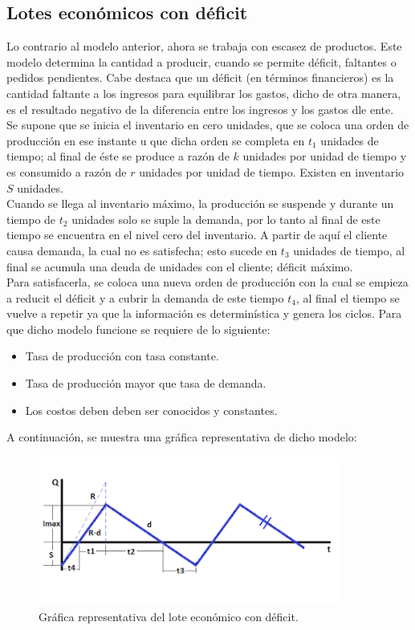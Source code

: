 \documentclass[letterpaper, 12pt]{article}
\begin{document}
    \subsection{Lotes económicos con déficit}
    \justify
    Lo contrario al modelo anterior, ahora se trabaja con escasez de productos. Este modelo determina la cantidad a producir, cuando se permite déficit, faltantes o pedidos pendientes. Cabe destaca que un déficit (en términos financieros)
    es la cantidad faltante a los ingresos para equilibrar los gastos, dicho de otra manera, es el resultado negativo de la diferencia entre los ingresos y los gastos dle ente.
    \\\newline 
    Se supone que se inicia el inventario en cero unidades, que se coloca una orden de producción en ese instante u que dicha orden se completa en \(t_1\) unidades de tiempo; al final de éste se produce a razón de \(k\) unidades por unidad de tiempo y es consumido
    a razón de \(r\) unidades por unidad de tiempo. Existen en inventario \(S\) unidades. \\\newline
    Cuando se llega al inventario máximo, la producción se suspende y durante un tiempo de \(t_2\) unidades solo se suple la demanda, por lo tanto al final de este tiempo se encuentra en el nivel cero del inventario. A partir de aquí el cliente causa demanda, la cual no es satisfecha;
    esto sucede en \(t_3\) unidades de tiempo, al final se acumula una deuda de unidades con el cliente; déficit máximo.
    \\\newline
    Para satisfacerla, se coloca una nueva orden de producción con la cual se empieza a reducit el déficit y a cubrir la demanda de este tiempo \(t_4\), al final el tiempo se vuelve a repetir ya que la información es determinística y genera los ciclos.
    Para que dicho modelo funcione se requiere de lo siguiente:
    \begin{itemize}
        \item Tasa de producción con tasa constante.
        \item Tasa de producción mayor que tasa de demanda.
        \item Los costos deben deben ser conocidos y constantes.
    \end{itemize}
    A continuación, se muestra una gráfica representativa de dicho modelo:
    \begin{figure}[H]
        \centering
        \includegraphics[width=10cm]{graficadeficit.png}
        \caption{Gráfica representativa del lote económico con déficit.}
    \end{figure}
\end{document}
